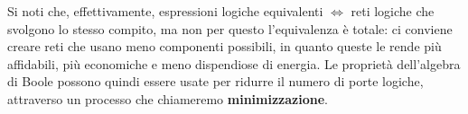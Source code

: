 \documentclass[a4paper,11pt]{article}
\begin{document}
Si noti che, effettivamente, espressioni logiche equivalenti $\Leftrightarrow$ reti logiche che svolgono lo stesso compito, ma non per questo l'equivalenza è totale: ci conviene creare reti che usano meno componenti possibili, in quanto queste le rende più affidabili, più economiche e meno dispendiose di energia.
Le proprietà dell'algebra di Boole possono quindi essere usate per ridurre il numero di porte logiche, attraverso un processo che chiameremo \textbf{minimizzazione}.
\end{document}

